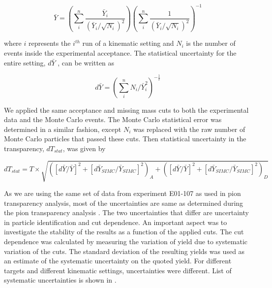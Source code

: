 \begin{equation} \label{equ:staterror1}
\bar{Y} = 
\left(\sum^{n}_{i}\frac{\bar{Y}_i}{(\bar{Y}_i/\sqrt{N_i})^2}\right)
\left(\sum^{n}_{i}\frac{1}{(\bar{Y}_i/\sqrt{N_i})^2}\right)^{-1}
\end{equation}

\noindent
where $i$ represents the $i^{th}$ run of a kinematic setting and $N_i$ is the number of events inside the experimental acceptance. The statistical uncertainty for the entire setting, $d\bar{Y}$ , can be written as

\begin{equation} \label{equ:staterror2}
d\bar{Y} = 
\left(\sum^{n}_{i}N_i/\bar{Y}_i^2\right)^{-\frac{1}{2}}
\end{equation}

We applied the same acceptance and missing mass cuts to both the experimental data and the Monte Carlo events. The Monte Carlo statistical error was determined in a similar fashion, except $N_i$ was replaced with the raw number of Monte Carlo particles that passed these cuts. Then statistical uncertainty in the transparency, $dT_{stat}$, was given by \cite{BC06}

\begin{equation} \label{equ:staterror3}
dT_{stat} = 
T \times \sqrt{\left(\left[d\bar{Y}/\bar{Y}\right]^2 + \left[d\bar{Y}_{SIMC}/\bar{Y}_{SIMC}\right]^2 \right)_A + 
\left(\left[d\bar{Y}/\bar{Y}\right]^2 + \left[d\bar{Y}_{SIMC}/\bar{Y}_{SIMC}\right]^2\right)_D}
\end{equation}

%
\label{Systematic Error Calculation}
As we are using the same set of data from experiment E01-107 as used in pion transparency analysis, most of the uncertainties are same as determined during the  pion transparency analysis \cite{BC06}. The two uncertainties that differ are uncertainty in particle identification and cut dependence. An important aspect was to investigate the stability of the results as a function of the applied cuts. The cut dependence was calculated by measuring the variation of yield due to systematic variation of the cuts. 
The standard deviation of the resulting yields was used as an estimate of the systematic uncertainty on the quoted yield. For different targets and different kinematic settings, uncertainties were different. List of systematic uncertainties is shown in .


